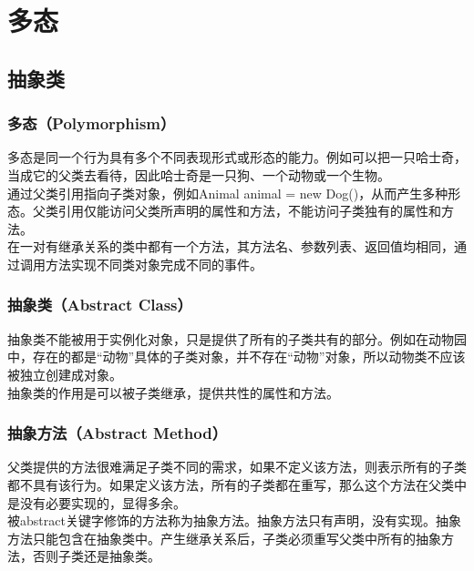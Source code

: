 \chapter{多态}

\section{抽象类}

\subsection{多态（Polymorphism）}

多态是同一个行为具有多个不同表现形式或形态的能力。例如可以把一只哈士奇，当成它的父类去看待，因此哈士奇是一只狗、一个动物或一个生物。\\

通过父类引用指向子类对象，例如Animal animal = new Dog()，从而产生多种形态。父类引用仅能访问父类所声明的属性和方法，不能访问子类独有的属性和方法。\\

在一对有继承关系的类中都有一个方法，其方法名、参数列表、返回值均相同，通过调用方法实现不同类对象完成不同的事件。\\

\subsection{抽象类（Abstract Class）}

抽象类不能被用于实例化对象，只是提供了所有的子类共有的部分。例如在动物园中，存在的都是“动物”具体的子类对象，并不存在“动物”对象，所以动物类不应该被独立创建成对象。\\

抽象类的作用是可以被子类继承，提供共性的属性和方法。\\

\subsection{抽象方法（Abstract Method）}

父类提供的方法很难满足子类不同的需求，如果不定义该方法，则表示所有的子类都不具有该行为。如果定义该方法，所有的子类都在重写，那么这个方法在父类中是没有必要实现的，显得多余。\\

被abstract关键字修饰的方法称为抽象方法。抽象方法只有声明，没有实现。抽象方法只能包含在抽象类中。产生继承关系后，子类必须重写父类中所有的抽象方法，否则子类还是抽象类。\\

